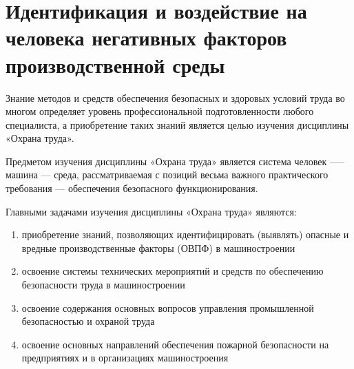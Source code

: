 




\chapter{Идентификация и воздействие на человека негативных факторов производственной среды}
Знание методов и средств обеспечения безопасных и здоровых условий труда во многом определяет уровень профессиональной подготовленности любого специалиста, а приобретение таких знаний является целью изучения дисциплины «Охрана труда».

Предметом изучения дисциплины «Охрана труда» является система человек —-- машина --- среда, рассматриваемая с позиций весьма важного практического требования --- обеспечения безопасного функционирования.


Главными задачами изучения дисциплины «Охрана труда» являются:
\begin{enumerate}
    \item приобретение знаний, позволяющих идентифицировать (выявлять) опасные и вредные производственные факторы (ОВПФ) в машиностроении
    \item освоение системы технических мероприятий и средств по обеспечению безопасности труда в машиностроении
    \item освоение содержания основных вопросов управления промышленной безопасностью и охраной труда
    \item освоение основных направлений обеспечения пожарной безопасности на предприятиях и в организациях машиностроения
\end{enumerate}


